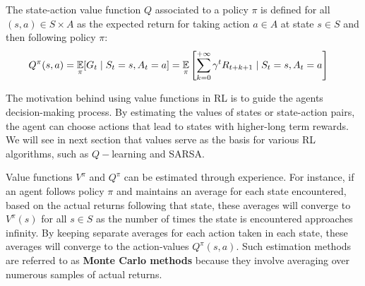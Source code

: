 \begin{definition}
    The state-action value function $Q$ associated to a policy $\pi$ is defined for all $(s,a) \in S \times A$ as the expected return for taking action $a \in A$ at state $s \in S$ and then following policy $\pi$:
    \begin{align*}
    Q^{\pi}(s,a) &=  \underset{\pi}{\mathbb E} [G_t \mid S_t =s, A_t = a]  = \underset{\pi}{\mathbb E}
    \left [
    \sum_{k =0}^{+ \infty} \gamma^t R_{t+k+1} \mid S_t = s, A_t = a \right ]
    \end{align*}
\end{definition}
The motivation behind using value functions in RL is to guide the agents decision-making process. By estimating the values of states or state-action pairs, the agent can choose actions that lead to states with higher-long term rewards. We will see in next section that values serve as the basis for various RL algorithms, such as $Q-$learning and SARSA.

Value functions $V^{\pi}$ and $Q^{\pi}$ can be estimated through experience. For instance, if an agent follows policy $\pi$ and maintains an average for each state encountered, based on the actual returns following that state, these averages will converge to $V^{\pi}(s)$ for all $s \in S$ as the number of times the state is encountered approaches infinity.
By keeping separate averages for each action taken in each state, these averages will converge to the action-values $Q^{\pi}(s,a)$. Such estimation methods are referred to as \textbf{Monte Carlo methods} because they involve averaging over numerous samples of actual returns.
